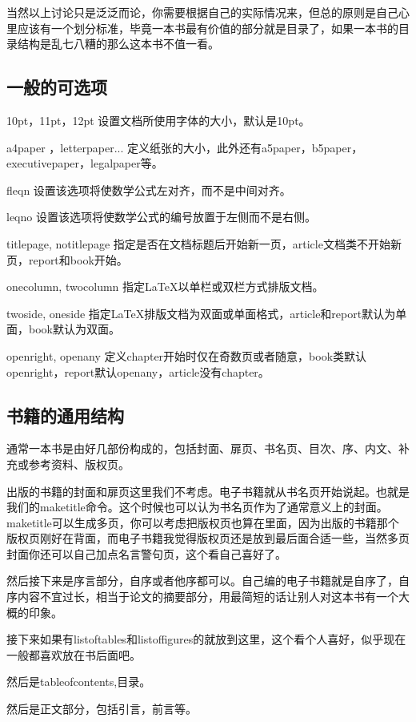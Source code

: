 \documentclass[12pt,oneside]{book}
\begin{document}
\begin{common-format}
当然以上讨论只是泛泛而论，你需要根据自己的实际情况来，但总的原则是自己心里应该有一个划分标准，毕竟一本书最有价值的部分就是目录了，如果一本书的目录结构是乱七八糟的那么这本书不值一看。

\subsection{一般的可选项}
10pt，11pt，12pt      设置文档所使用字体的大小，默认是10pt。

a4paper ，letterpaper...      定义纸张的大小，此外还有a5paper，b5paper，executivepaper，legalpaper等。

fleqn       设置该选项将使数学公式左对齐，而不是中间对齐。

leqno       设置该选项将使数学公式的编号放置于左侧而不是右侧。

titlepage, notitlepage       指定是否在文档标题后开始新一页，article文档类不开始新页，report和book开始。

onecolumn, twocolumn       指定LaTeX以单栏或双栏方式排版文档。

twoside, oneside       指定LaTeX排版文档为双面或单面格式，article和report默认为单面，book默认为双面。

openright, openany       定义chapter开始时仅在奇数页或者随意，book类默认openright，report默认openany，article没有chapter。




\subsection{书籍的通用结构}
通常一本书是由好几部份构成的，包括封面、扉页、书名页、目次、序、内文、补充或参考资料、版权页。

出版的书籍的封面和扉页这里我们不考虑。电子书籍就从书名页开始说起。也就是我们的maketitle命令。这个时候也可以认为书名页作为了通常意义上的封面。maketitle可以生成多页，你可以考虑把版权页也算在里面，因为出版的书籍那个版权页刚好在背面，而电子书籍我觉得版权页还是放到最后面合适一些，当然多页封面你还可以自己加点名言警句页，这个看自己喜好了。

然后接下来是序言部分，自序或者他序都可以。自己编的电子书籍就是自序了，自序内容不宜过长，相当于论文的摘要部分，用最简短的话让别人对这本书有一个大概的印象。

接下来如果有listoftables和listoffigures的就放到这里，这个看个人喜好，似乎现在一般都喜欢放在书后面吧。

然后是tableofcontents,目录。

然后是正文部分，包括引言，前言等。


\end{common-format}
\end{document}
